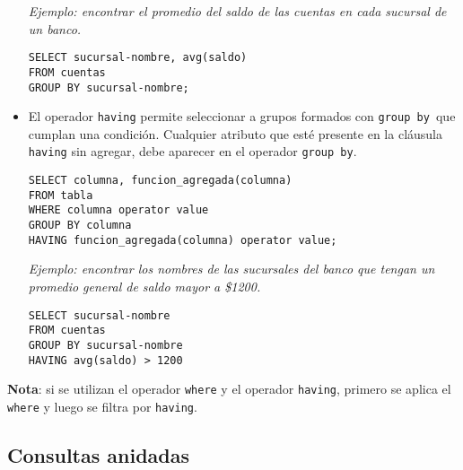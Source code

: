 \documentclass[a4paper, twoside]{article}
\begin{document}
\begin{itemize}
\emph{Ejemplo: encontrar el promedio del saldo de las cuentas en cada
sucursal de un banco.}


\begin{lstlisting}
SELECT sucursal-nombre, avg(saldo)
FROM cuentas
GROUP BY sucursal-nombre;
\end{lstlisting}


\item El operador \texttt{having} permite seleccionar a grupos formados
con \texttt{group by }que cumplan una condición. Cualquier atributo
que esté presente en la cláusula \texttt{having} sin agregar, debe
aparecer en el operador \texttt{group by}.


\begin{lstlisting}
SELECT columna, funcion_agregada(columna) 
FROM tabla 
WHERE columna operator value 
GROUP BY columna
HAVING funcion_agregada(columna) operator value;
\end{lstlisting}



\emph{Ejemplo: encontrar los nombres de las sucursales del banco que
tengan un promedio general de saldo mayor a \$1200.}


\begin{lstlisting}
SELECT sucursal-nombre
FROM cuentas
GROUP BY sucursal-nombre
HAVING avg(saldo) > 1200
\end{lstlisting}


\end{itemize}
\textbf{Nota}: si se utilizan el operador \texttt{where} y el operador
\texttt{having}, primero se aplica el \texttt{where} y luego se filtra
por \texttt{having}.


\subsection{Consultas anidadas}
\end{document}
